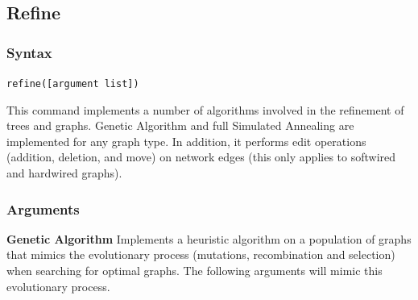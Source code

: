 \subsection{Refine}
\label{subsec:refine}
	\subsubsection{Syntax}
		\texttt{refine([argument list])}
		
	\begin{phygdescription}
		{This command implements a number of algorithms involved in the refinement of 
		trees and graphs. Genetic Algorithm \citep{Holland1975, moilanen1999} and full 
		Simulated Annealing \citep{Metropolisetal1953, Kirkpatricketal1983, Cerny1985} 
		are implemented for any graph type. In addition, it performs edit operations (addition, 
		deletion, and move) on network edges (this only applies to softwired and hardwired 
		graphs).}
	\end{phygdescription}

	\subsubsection{Arguments}

	\textbf{Genetic Algorithm} Implements a heuristic algorithm on a population of graphs 
	that mimics the evolutionary process (mutations, recombination and selection)
	when searching for optimal graphs. The following arguments will mimic this evolutionary 
	process. 
	
